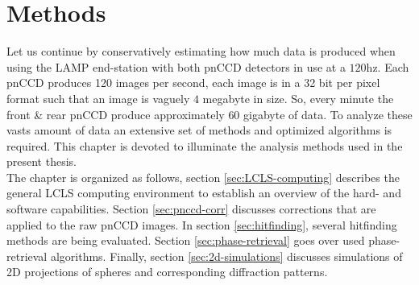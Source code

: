 \chapter{Methods}\label{ch:methods}
Let us continue by conservatively estimating  how much data is produced when using the LAMP end-station with both pnCCD detectors in use at a $120$hz. Each pnCCD produces 120 images per second, each image is in a 32 bit per pixel format such that an image is vaguely $4$ megabyte in size. So, every minute the front \& rear pnCCD produce approximately $60$ gigabyte of data. To analyze these vasts amount of data an extensive set of methods and optimized algorithms is required. This chapter is devoted to illuminate the analysis methods used in the present thesis.\\
The chapter is organized as follows, section \ref{sec:LCLS-computing} describes the general LCLS computing environment to establish an overview of the hard- and software capabilities. Section \ref{sec:pnccd-corr} discusses corrections that are applied to the raw pnCCD images. In section \ref{sec:hitfinding}, several hitfinding methods are being evaluated. Section \ref{sec:phase-retrieval} goes over used phase-retrieval algorithms. Finally, section \ref{sec:2d-simulations} discusses simulations of 2D projections of spheres and corresponding diffraction patterns.
%
%
%
